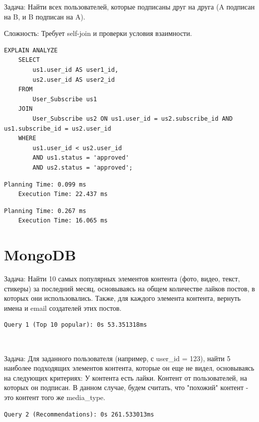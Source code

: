 \documentclass{article}
\begin{document}
Задача: Найти всех пользователей, которые подписаны друг на друга (A подписан на B, и B подписан на A).

Сложность: Требует self-join и проверки условия взаимности.
\begin{lstlisting}[caption={subs}, label={lst:example}]
    EXPLAIN ANALYZE
    SELECT
        us1.user_id AS user1_id,
        us2.user_id AS user2_id
    FROM
        User_Subscribe us1
    JOIN
        User_Subscribe us2 ON us1.user_id = us2.subscribe_id AND us1.subscribe_id = us2.user_id
    WHERE
        us1.user_id < us2.user_id  
        AND us1.status = 'approved'
        AND us2.status = 'approved';
\end{lstlisting}
\begin{lstlisting}[caption={explain analyze without indexes}, label={lst:example}]
    Planning Time: 0.099 ms
    Execution Time: 22.437 ms
\end{lstlisting}
\begin{lstlisting}[caption={explain analyze with indexes}, label={lst:example}]
    Planning Time: 0.267 ms
    Execution Time: 16.065 ms
\end{lstlisting}

\section{MongoDB}

Задача: Найти 10 самых популярных элементов контента (фото, видео, текст, стикеры) за последний месяц, 
основываясь на общем количестве лайков постов, в которых они использовались. 
Также, для каждого элемента контента, вернуть имена и email создателей этих постов.
\begin{lstlisting}[caption={analyze without indexes}, label={lst:example}]
    Query 1 (Top 10 popular): 0s 53.351318ms
\end{lstlisting}
\begin{lstlisting}[caption={analyze with indexes}, label={lst:example}]
    
\end{lstlisting}

Задача: Для заданного пользователя (например, с user\_id = 123), найти 5 наиболее подходящих элементов контента,
которые он еще не видел, основываясь на следующих критериях:
У контента есть лайки.
Контент от пользователей, на которых он подписан.
В данном случае, будем считать, что "похожий" контент - это контент того же media\_type.
\begin{lstlisting}[caption={analyze without indexes}, label={lst:example}]
    Query 2 (Recommendations): 0s 261.533013ms
\end{lstlisting}
\begin{lstlisting}[caption={analyze with indexes}, label={lst:example}]
    
\end{lstlisting}
\end{document}
